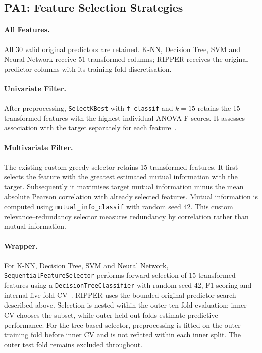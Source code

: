 \subsection{PA1: Feature Selection Strategies}
\paragraph{All Features.} All 30 valid original predictors are retained. K-NN, Decision Tree, SVM and Neural Network receive 51 transformed columns; RIPPER receives the original predictor columns with its training-fold discretisation.

\paragraph{Univariate Filter.} After preprocessing, \texttt{SelectKBest} with \texttt{f\_classif} and $k=15$ retains the 15 transformed features with the highest individual ANOVA F-scores. It assesses association with the target separately for each feature~\cite{selectiondocs}.

\paragraph{Multivariate Filter.} The existing custom greedy selector retains 15 transformed features. It first selects the feature with the greatest estimated mutual information with the target. Subsequently it maximises target mutual information minus the mean absolute Pearson correlation with already selected features. Mutual information is computed using \texttt{mutual\_info\_classif} with random seed 42. This custom relevance--redundancy selector measures redundancy by correlation rather than mutual information.

\paragraph{Wrapper.} For K-NN, Decision Tree, SVM and Neural Network, \texttt{SequentialFeatureSelector} performs forward selection of 15 transformed features using a \texttt{DecisionTreeClassifier} with random seed 42, F1 scoring and internal five-fold CV~\cite{selectiondocs}. RIPPER uses the bounded original-predictor search described above. Selection is nested within the outer ten-fold evaluation: inner CV chooses the subset, while outer held-out folds estimate predictive performance. For the tree-based selector, preprocessing is fitted on the outer training fold before inner CV and is not refitted within each inner split. The outer test fold remains excluded throughout.

